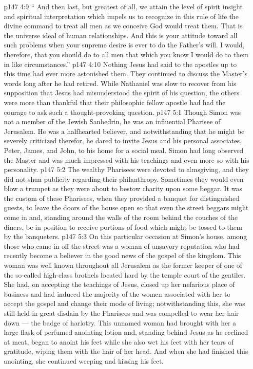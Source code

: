 \vs p147 4:9 \pc \textcolor{ubdarkred}{“\bibnobreakspace {} And then last, but greatest of all, we attain the level of spirit insight and spiritual interpretation which impels us to recognize in this rule of life the divine command to treat all men as we conceive God would treat them. That is the universe ideal of human relationships. And this is your attitude toward all such problems when your supreme desire is ever to do the Father’s will. I would, therefore, that you should do to all men that which you know I would do to them in like circumstances.”}
\vs p147 4:10 \pc Nothing Jesus had said to the apostles up to this time had ever more astonished them. They continued to discuss the Master’s words long after he had retired. While Nathaniel was slow to recover from his supposition that Jesus had misunderstood the spirit of his question, the others were more than thankful that their philosophic fellow apostle had had the courage to ask such a thought\hyp{}provoking question.
\vs p147 5:1 Though Simon was not a member of the Jewish Sanhedrin, he was an influential Pharisee of Jerusalem. He was a halfhearted believer, and notwithstanding that he might be severely criticized therefor, he dared to invite Jesus and his personal associates, Peter, James, and John, to his home for a social meal. Simon had long observed the Master and was much impressed with his teachings and even more so with his personality.
\vs p147 5:2 The wealthy Pharisees were devoted to almsgiving, and they did not shun publicity regarding their philanthropy. Sometimes they would even blow a trumpet as they were about to bestow charity upon some beggar. It was the custom of these Pharisees, when they provided a banquet for distinguished guests, to leave the doors of the house open so that even the street beggars might come in and, standing around the walls of the room behind the couches of the diners, be in position to receive portions of food which might be tossed to them by the banqueters.
\vs p147 5:3 On this particular occasion at Simon’s house, among those who came in off the street was a woman of unsavory reputation who had recently become a believer in the good news of the gospel of the kingdom. This woman was well known throughout all Jerusalem as the former keeper of one of the so\hyp{}called high\hyp{}class brothels located hard by the temple court of the gentiles. She had, on accepting the teachings of Jesus, closed up her nefarious place of business and had induced the majority of the women associated with her to accept the gospel and change their mode of living; notwithstanding this, she was still held in great disdain by the Pharisees and was compelled to wear her hair down --- the badge of harlotry. This unnamed woman had brought with her a large flask of perfumed anointing lotion and, standing behind Jesus as he reclined at meat, began to anoint his feet while she also wet his feet with her tears of gratitude, wiping them with the hair of her head. And when she had finished this anointing, she continued weeping and kissing his feet.
